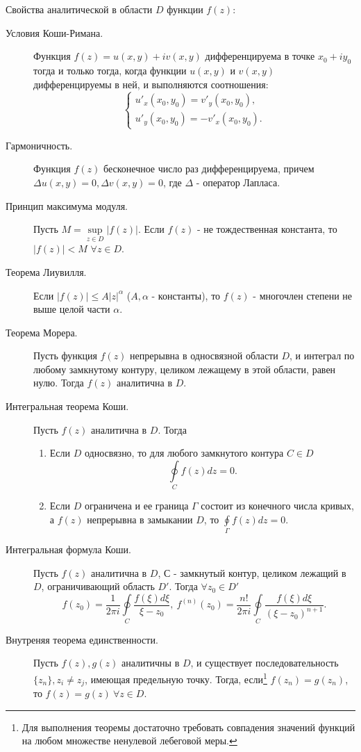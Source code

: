 \documentclass[a4paper,12pt]{scrartcl}
\begin{document}
Свойства аналитической в области $D$ функции $f(z)$:
\begin{description}
\item[Условия Коши-Римана.] Функция $f(z) = u(x,y) + iv(x,y)$ дифференцируема в точке $x_0+iy_0$ тогда и только тогда, когда функции $u(x,y)$ и $v(x,y)$ дифференцируемы в ней, и выполняются соотношения:
$$
\begin{cases}
 u'_x(x_0,y_0) = v'_y(x_0,y_0), \\ u'_y(x_0,y_0) = -v'_x(x_0,y_0).
\end{cases}
$$
\item [Гармоничность.] Функция $f(z)$ бесконечное число раз дифференцируема, причем $\Delta u(x,y) = 0, \Delta v(x,y) = 0$, где $\Delta$ - оператор Лапласа.
\item[Принцип максимума модуля.] Пусть $M = \sup\limits_{z\in D}|f(z)|$. Если $f(z)$ - не тождественная константа, то $|f(z)| < M$  $\forall z\in D$.
\item[Теорема Лиувилля.] Если $|f(z)| \leqslant A|z|^\alpha$ ($A,\alpha$ - константы), то $f(z)$ - многочлен степени не выше  целой части $\alpha$.
\item[Теорема Морера.] Пусть функция $f(z)$ непрерывна в односвязной области $D$, и интеграл по любому замкнутому контуру, целиком лежащему в этой области, равен нулю. Тогда $f(z)$ аналитична в $D$.
\item[Интегральная теорема Коши.] Пусть $f(z)$ аналитична в $D$. Тогда
\begin{enumerate}
 \item Если $D$ односвязно, то для любого замкнутого контура $C\in D$ $$\oint\limits_{C}f(z)dz=0.$$
 \item Если $D$ ограничена и ее граница $\Gamma$ состоит из конечного числа кривых, а $f(z)$ непрерывна в замыкании $D$, то $\oint\limits_{\Gamma}f(z)dz = 0.$ 
\end{enumerate}

\item[Интегральная формула Коши.] Пусть $f(z)$ аналитична в $D$, $С$ - замкнутый контур, целиком лежащий в $D$, ограничивающий область $D'$. Тогда $\forall z_0 \in D' $ $$f(z_0) = \dfrac{1}{2\pi i}\oint\limits_{C}\dfrac{f(\xi)d\xi}{\xi-z_0},\  f^{(n)}(z_0) = \dfrac{n!}{2\pi i}\oint\limits_{C}\dfrac{f(\xi)d\xi}{(\xi-z_0)^{n+1}}.$$
\item[Внутреняя теорема единственности.] Пусть $f(z),g(z)$ аналитичны в $D$, и существует последовательность $\{z_n\}, z_i \neq z_j$, имеющая предельную точку. Тогда, если\footnote{Для выполнения теоремы достаточно требовать совпадения значений функций на любом множестве ненулевой лебеговой меры.} $f(z_n) = g(z_n)$, то $f(z) = g(z)\ \forall z\in D$.
\end{description}
\end{document}

